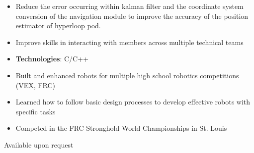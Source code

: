 \documentclass[10pt, letterpaper, ragged2e, withhyper]{altacv}
\begin{document}
\begin{paracol}{2}
    \divider
    
    \begin{itemize}
        \item Reduce the error occurring within kalman filter and the coordinate system conversion of the navigation
        module to improve the accuracy of the position estimator of hyperloop pod.  
        \item Improve skills in interacting with members across multiple technical teams
        \item \textbf{Technologies}: C/C++
    \end{itemize}

    \divider

    \begin{itemize}
        \item Built and enhanced robots for multiple high school robotics competitions (VEX, FRC)
        \item Learned how to follow basic design processes to develop effective robots with specific tasks
        \item Competed in the FRC Stronghold World Championships in St. Louis 
    \end{itemize}

    Available upon request

\end{paracol}
\end{document}
